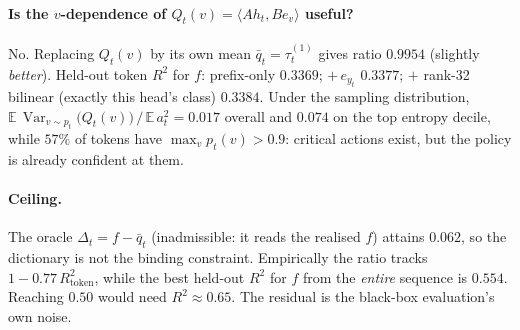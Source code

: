 \documentclass{article}
\theoremstyle{plain}
\theoremstyle{definition}
\newcommand{\E}{\mathbb{E}}
\DeclareMathOperator{\Var}{Var}
\begin{document}
\paragraph{Is the $v$-dependence of $Q_t(v)=\langle Ah_t,Be_v\rangle$ useful?} No.
Replacing $Q_t(v)$ by its own mean $\bar q_t=\tau^{(1)}_t$ gives ratio $0.9954$ (slightly \emph{better}).
Held-out token $R^2$ for $f$: prefix-only $0.3369$; $+\,e_{y_t}$ $0.3377$; $+$ rank-32 bilinear
(exactly this head's class) $0.3384$. Under the sampling distribution,
$\E\,\Var_{v\sim p_t}\!\big(Q_t(v)\big)\,/\,\E\,a_t^2=0.017$ overall and $0.074$ on the top entropy decile,
while $57\%$ of tokens have $\max_v p_t(v)>0.9$: critical actions exist, but the policy is already
confident at them.

\paragraph{Ceiling.} The oracle $\Delta_t=f-\bar q_t$ (inadmissible: it reads the realised $f$) attains
$0.062$, so the dictionary is not the binding constraint. Empirically the ratio tracks
$1-0.77\,R^2_{\text{token}}$, while the best held-out $R^2$ for $f$ from the \emph{entire} sequence is
$0.554$. Reaching $0.50$ would need $R^2\approx0.65$. The residual is the black-box evaluation's own noise.
\end{document}
